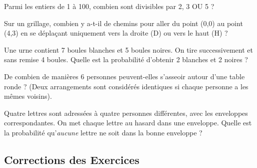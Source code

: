 \begin{exercicebox}
Parmi les entiers de 1 à 100, combien sont divisibles par 2, 3 OU 5 ?
\end{exercicebox}


\begin{exercicebox}
Sur un grillage, combien y a-t-il de chemins pour aller du point (0,0) au point (4,3) en se déplaçant uniquement vers la droite (D) ou vers le haut (H) ?
\end{exercicebox}

\begin{exercicebox}
Une urne contient 7 boules blanches et 5 boules noires. On tire successivement et sans remise 4 boules. Quelle est la probabilité d'obtenir 2 blanches et 2 noires ?
\end{exercicebox}

\begin{exercicebox}
De combien de manières 6 personnes peuvent-elles s'asseoir autour d'une table ronde ? (Deux arrangements sont considérés identiques si chaque personne a les mêmes voisins).
\end{exercicebox}

\begin{exercicebox}
Quatre lettres sont adressées à quatre personnes différentes, avec les enveloppes correspondantes. On met chaque lettre au hasard dans une enveloppe. Quelle est la probabilité qu'\textit{aucune} lettre ne soit dans la bonne enveloppe ?
\end{exercicebox}



\subsection{Corrections des Exercices}


